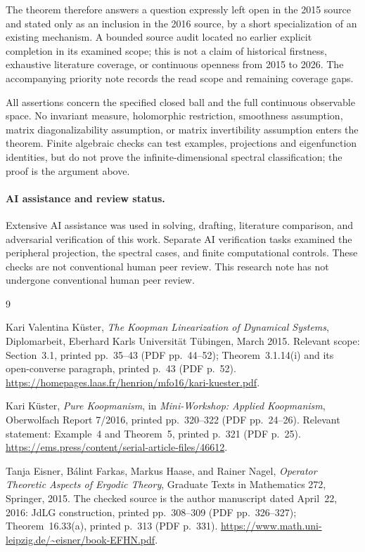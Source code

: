 \documentclass[11pt]{article}
\begin{document}
The theorem therefore answers a question expressly left open in the
2015 source and stated only as an inclusion in the 2016 source, by a
short specialization of an existing mechanism. A bounded source audit
located no earlier explicit completion in its examined scope; this is
not a claim of historical firstness, exhaustive literature coverage, or
continuous openness from 2015 to 2026. The accompanying priority note
records the read scope and remaining coverage gaps.

All assertions concern the specified closed ball and the full continuous
observable space. No invariant measure, holomorphic restriction,
smoothness assumption, matrix diagonalizability assumption, or matrix
invertibility assumption enters the theorem. Finite algebraic checks
can test examples, projections and eigenfunction identities, but do not
prove the infinite-dimensional spectral classification; the proof is the
argument above.

\paragraph{AI assistance and review status.}
Extensive AI assistance was used in solving, drafting, literature
comparison, and adversarial verification of this work. Separate AI
verification tasks examined the peripheral projection, the spectral
cases, and finite computational controls. These checks are not
conventional human peer review. This research note has not undergone
conventional human peer review.

\newpage
\begin{thebibliography}{9}

Kari Valentina K\"uster,
\emph{The Koopman Linearization of Dynamical Systems},
Diplomarbeit, Eberhard Karls Universit\"at T\"ubingen, March 2015.
Relevant scope: Section~3.1, printed pp.~35--43 (PDF pp.~44--52);
Theorem~3.1.14(i) and its open-converse paragraph, printed p.~43
(PDF p.~52).
\url{https://homepages.laas.fr/henrion/mfo16/kari-kuester.pdf}.

Kari K\"uster,
\emph{Pure Koopmanism},
in \emph{Mini-Workshop: Applied Koopmanism},
Oberwolfach Report 7/2016, printed pp.~320--322
(PDF pp.~24--26).
Relevant statement: Example~4 and Theorem~5, printed p.~321
(PDF p.~25).
\url{https://ems.press/content/serial-article-files/46612}.

Tanja Eisner, B\'alint Farkas, Markus Haase, and Rainer Nagel,
\emph{Operator Theoretic Aspects of Ergodic Theory},
Graduate Texts in Mathematics 272, Springer, 2015.
The checked source is the author manuscript dated April~22, 2016:
JdLG construction, printed pp.~308--309 (PDF pp.~326--327);
Theorem~16.33(a), printed p.~313 (PDF p.~331).
\url{https://www.math.uni-leipzig.de/~eisner/book-EFHN.pdf}.

\end{thebibliography}
\end{document}
